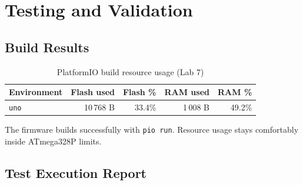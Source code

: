 \documentclass[12pt]{article}
\begin{document}
\section{Testing and Validation}

\subsection{Build Results}

\begin{table}[H]
\centering
\begin{tabular}{lrrrr}
\toprule
\textbf{Environment} & \textbf{Flash used} & \textbf{Flash \%} & \textbf{RAM used} & \textbf{RAM \%} \\
\midrule
\texttt{uno} & 10\,768 B & 33.4\% & 1\,008 B & 49.2\% \\
\bottomrule
\end{tabular}
\caption{PlatformIO build resource usage (Lab 7)}
\label{tab:build}
\end{table}

The firmware builds successfully with \texttt{pio run}. Resource usage stays comfortably inside ATmega328P limits.

\subsection{Test Execution Report}
\end{document}
